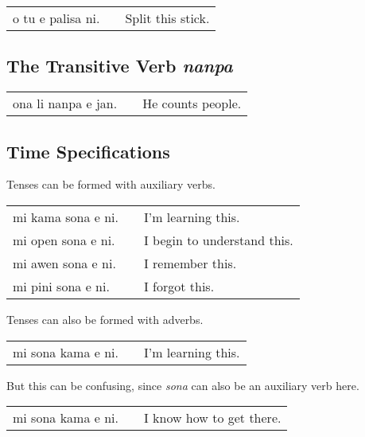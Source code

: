 \begin{supertabular}{p{5,5cm}|ll}
    o tu e palisa ni. &  & Split this stick. \\
\end{supertabular}

%
%
\subsection*{The Transitive Verb \textit{nanpa}}
%
%

\begin{supertabular}{p{5,5cm}|ll}
    ona li nanpa e jan. &  & He counts people. \\
\end{supertabular}
%
%
%
%
%
\subsection*{Time Specifications}
%
%
Tenses can be formed with auxiliary verbs.

\begin{supertabular}{p{5,5cm}|ll}
    mi kama sona e ni. &  & I'm learning this.          \\
    mi open sona e ni. &  & I begin to understand this. \\
    mi awen sona e ni. &  & I remember this.            \\
    mi pini sona e ni. &  & I forgot this.              \\
\end{supertabular}

Tenses can also be formed with adverbs.

\begin{supertabular}{p{5,5cm}|ll}
    mi sona kama e ni. &  & I'm learning this. \\
\end{supertabular}

But this can be confusing, since \textit{sona} can also be an auxiliary verb here.

\begin{supertabular}{p{5,5cm}|ll}
    mi sona kama e ni. &  & I know how to get there. \\
\end{supertabular}

